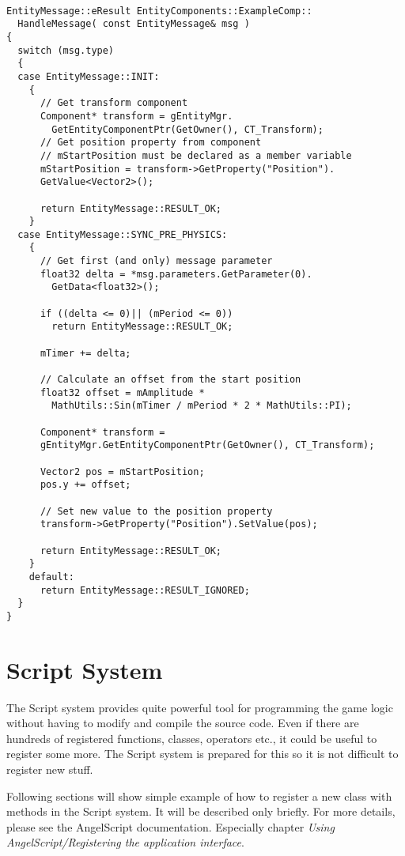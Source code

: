\documentclass[a4paper, 12pt]{report}
\begin{document}
\begin{verbatim}

EntityMessage::eResult EntityComponents::ExampleComp::
  HandleMessage( const EntityMessage& msg )
{
  switch (msg.type)
  {
  case EntityMessage::INIT:
    {
      // Get transform component
      Component* transform = gEntityMgr.
        GetEntityComponentPtr(GetOwner(), CT_Transform);
      // Get position property from component
      // mStartPosition must be declared as a member variable
      mStartPosition = transform->GetProperty("Position").
      GetValue<Vector2>();

      return EntityMessage::RESULT_OK;
    }
  case EntityMessage::SYNC_PRE_PHYSICS:
    {
      // Get first (and only) message parameter
      float32 delta = *msg.parameters.GetParameter(0).
        GetData<float32>();

      if ((delta <= 0)|| (mPeriod <= 0))
        return EntityMessage::RESULT_OK;

      mTimer += delta;

      // Calculate an offset from the start position
      float32 offset = mAmplitude * 
        MathUtils::Sin(mTimer / mPeriod * 2 * MathUtils::PI);

      Component* transform = 
      gEntityMgr.GetEntityComponentPtr(GetOwner(), CT_Transform);

      Vector2 pos = mStartPosition;
      pos.y += offset;

      // Set new value to the position property
      transform->GetProperty("Position").SetValue(pos);

      return EntityMessage::RESULT_OK;
    }
    default:
      return EntityMessage::RESULT_IGNORED;
  }
}
\end{verbatim}

\chapter{Script System}

The Script system provides quite powerful tool for programming the game logic without having to modify and compile the source code. Even if there are hundreds of registered functions, classes, operators etc., it could be useful to register some more. The Script system is prepared for this so it is not difficult to register new stuff.

Following sections will show simple example of how to register a new class with methods in the Script system. It will be described only briefly. For more details, please see the AngelScript documentation. Especially chapter \emph{Using AngelScript/Registering the application interface}.
\end{document}
